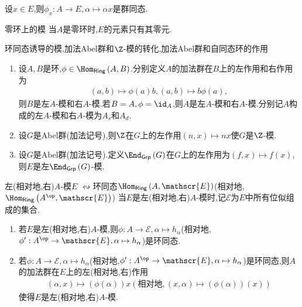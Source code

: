 \begin{proposition}{}{}
	设$x\in E$,则$\phi_{x}:A\to E,\alpha\mapsto\alpha x$是群同态.
\end{proposition}

\begin{remark}{零环上的模}{}
	当$A$是零环时,$E$的元素只有其零元.
\end{remark}

\begin{example}{环同态诱导的模,加法Abel群和$\Z$-模的转化,加法Abel群和自同态环的作用}{}
	\begin{enumerate}
		\item 设$A,B$是环,$\phi\in\Hom_{\mathsf{Ring}}\left(A,B\right)$.分别定义$A$的加法群在$B$上的左作用和右作用为
		\begin{align*}
			\left(a,b\right)\mapsto\phi\left(a\right)b,\left(a,b\right)\mapsto b\phi\left(a\right),
		\end{align*}
		则$B$是左$A$-模和右$A$-模.若$B=A,\phi=\id_{A}$,则$A$是左$A$-模和右$A$-模.分别记$A$构成的左$A$-模和右$A$-模为$A_{s}$和$A_{d}$.
		\item 设$G$是Abel群(加法记号),则$\Z$在$G$上的左作用$\left(n,x\right)\mapsto nx$使$G$是$\Z$-模.
		\item 设$G$是Abel群(加法记号).定义$\End_{\mathsf{Grp}}\left(G\right)$在$G$上的左作用为$\left(f,x\right)\mapsto f\left(x\right)$,则$E$是左$\End_{\mathsf{Grp}}\left(G\right)$-模.
	\end{enumerate}
\end{example}

\begin{proposition}{左(相对地,右)$A$-模$E$ $\leftrightsquigarrow$环同态$\Hom_{\mathsf{Ring}}\left(A,\mathscr{E}\right)$(相对地,$\Hom_{\mathsf{Ring}}\left(A^{\op},\mathscr{E}\right)$)}{}
	当$E$是左(相对地,右)$A$-模时,记$\mathscr{E}$为$E$中所有位似组成的集合.
	\begin{enumerate}
		\item 若$E$是左(相对地,右)$A$-模,则$\phi:A\to\mathscr{E},\alpha\mapsto h_{\alpha}$(相对地,$\phi^{\prime}:A^{\op}\to\mathscr{E},\alpha\mapsto h_{\alpha}$)是环同态.
		\item 若$\phi:A\to\mathscr{E},\alpha\mapsto h_{\alpha}$(相对地,$\phi^{\prime}:A^{\op}\to\mathscr{E},\alpha\mapsto h_{\alpha}$)是环同态,则$A$的加法群在$E$上的左(相对地,右)作用
		\begin{align*}
			\left(\alpha,x\right)\mapsto\left(\phi\left(\alpha\right)\right)x(\text{相对地},\left(x,\alpha\right)\mapsto\left(\phi\left(\alpha\right)\right)\left(x\right))
		\end{align*}
		使得$E$是左(相对地,右)$A$-模.
	\end{enumerate}
\end{proposition}

